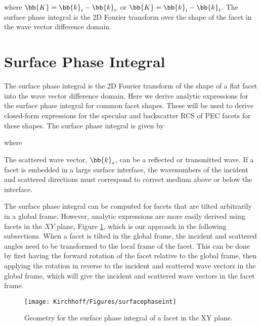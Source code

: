 \noindent where $\bb{K} = \bb{k}_i - \bb{k}_r$ or $\bb{K} = \bb{k}_i - \bb{k}_t$.  The surface phase integral is the 2D Fourier transform over the shape of the facet in the wave vector difference domain. 


\section{Surface Phase Integral}
\label{secsurfphaseint}
The surface phase integral is the 2D Fourier transform of the shape of a flat facet into the wave vector difference domain. Here we derive analytic expressions for the surface phase integral for common facet shapes. These will be used to derive closed-form expressions for the specular and backscatter RCS of PEC facets for these shapes.  The surface phase integral is given by 

\noindent where 

The scattered wave vector, $\bb{k}_s$, can be a reflected or transmitted wave. If a facet is embedded in a large surface interface, the wavenumbers of the incident and scattered directions must correspond to correct medium above or below the interface. 

The surface phase integral can be computed for facets that are tilted arbitrarily in a global frame. However, analytic expressions are more easily derived using facets in the $XY$ plane, Figure \ref{kirchhoffXY}, which is our approach in the following subsections. When a facet is tilted in the global frame, the incident and scattered angles need to be transformed to the local frame of the facet. This can be done by first having the forward rotation of the facet relative to the global frame, then applying the rotation in reverse to the incident and scattered wave vectors in the global frame, which will give the incident and scattered wave vectors in the facet frame.

\begin{figure}[H] 
   \centering
   \texttt{[image: Kirchhoff/Figures/surfacephaseint]} 
   \caption{Geometry for the surface phase integral of a facet in the XY plane.}
     \label{kirchhoffXY}
\end{figure}




